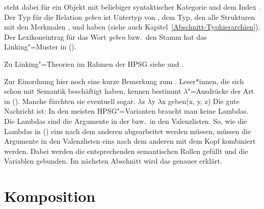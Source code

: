 \z
[] steht dabei für ein Objekt mit beliebiger syntaktischer Kategorie und dem Index
. 
Der Typ für die Relation \emph{geben} ist Untertyp von , dem Typ, den alle
Strukturen mit den Merkmalen \argone, \argtwo und \argthree haben (siehe auch Kapitel~\ref{Abschnitt-Typhierarchien}). 
Der Lexikoneintrag für das Wort \emph{geben} bzw.\ den Stamm  hat das Linking"=Muster in
(). 



Zu Linking"=Theorien im Rahmen der HPSG siehe  und .

Zur Einordnung hier noch eine kurze Bemerkung zum . Leser*innen, die sich schon mit
Semantik beschäftigt haben, kennen bestimmt $\lambda$"=Ausdrücke der Art in (). Manche
fürchten sie eventuell sogar.
\ea
$\lambda$z $\lambda$y $\lambda$x geben(x, y, z)
\z
Die gute Nachricht ist: In den meisten HPSG"=Varianten braucht man keine Lambdas. Die Lambdas sind
die Argumente in der \argstl bzw.\ in den Valenzlisten. So, wie die Lambdas in () eins nach
dem anderen abgearbeitet werden müssen, müssen die Argumente in den Valenzlisten eins nach dem
anderen mit dem Kopf kombiniert werden. Dabei werden die entsprechenden semantischen Rollen gefüllt
und die Variablen gebunden. Im nächsten Abschnitt wird das genauer erklärt.

\section{Komposition}
\label{sec-Komposition}

